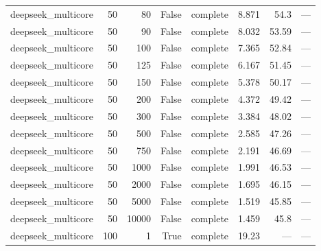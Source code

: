 \begin{tabular}{lrrrlrrl}
deepseek\_multicore & 50 & 80 & False & complete & 8.871 & 54.3 & — \\
deepseek\_multicore & 50 & 90 & False & complete & 8.032 & 53.59 & — \\
deepseek\_multicore & 50 & 100 & False & complete & 7.365 & 52.84 & — \\
deepseek\_multicore & 50 & 125 & False & complete & 6.167 & 51.45 & — \\
deepseek\_multicore & 50 & 150 & False & complete & 5.378 & 50.17 & — \\
deepseek\_multicore & 50 & 200 & False & complete & 4.372 & 49.42 & — \\
deepseek\_multicore & 50 & 300 & False & complete & 3.384 & 48.02 & — \\
deepseek\_multicore & 50 & 500 & False & complete & 2.585 & 47.26 & — \\
deepseek\_multicore & 50 & 750 & False & complete & 2.191 & 46.69 & — \\
deepseek\_multicore & 50 & 1000 & False & complete & 1.991 & 46.53 & — \\
deepseek\_multicore & 50 & 2000 & False & complete & 1.695 & 46.15 & — \\
deepseek\_multicore & 50 & 5000 & False & complete & 1.519 & 45.85 & — \\
deepseek\_multicore & 50 & 10000 & False & complete & 1.459 & 45.8 & — \\
deepseek\_multicore & 100 & 1 & True & complete & 19.23 & — & — \\
\bottomrule
\end{tabular}
